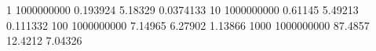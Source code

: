 1 1000000000 0.193924 5.18329 0.0374133
10 1000000000 0.61145 5.49213 0.111332
100 1000000000 7.14965 6.27902 1.13866
1000 1000000000 87.4857 12.4212 7.04326
